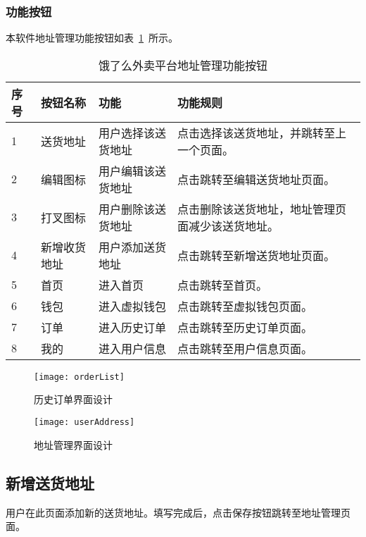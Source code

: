 \subsubsection{功能按钮}
本软件地址管理功能按钮如表~\ref{tab:table13}~所示。
\begin{table}[htbp]
    \caption{饿了么外卖平台地址管理功能按钮}\label{tab:table13}
    \vspace{0.5em}\wuhao
    \begin{tabularx}{\textwidth}{lllX}
    \toprule[1.5pt]
    序号 & 按钮名称 & 功能 & 功能规则 \\ 
    \midrule[1pt]
    1 & 送货地址 & 用户选择该送货地址 & 点击选择该送货地址，并跳转至上一个页面。 \\
    2 & 编辑图标 & 用户编辑该送货地址 & 点击跳转至编辑送货地址页面。 \\
    3 & 打叉图标 & 用户删除该送货地址 & 点击删除该送货地址，地址管理页面减少该送货地址。 \\
    4 & 新增收货地址 & 用户添加送货地址 & 点击跳转至新增送货地址页面。 \\
    5 & 首页 & 进入首页 & 点击跳转至首页。 \\
    6 & 钱包 & 进入虚拟钱包 & 点击跳转至虚拟钱包页面。 \\
    7 & 订单 & 进入历史订单 & 点击跳转至历史订单页面。 \\
    8 & 我的 & 进入用户信息 & 点击跳转至用户信息页面。 \\
\bottomrule[1.5pt]
\end{tabularx}
\vspace{\baselineskip}
\end{table}
\begin{figure}[htbp]
    \centering
    \begin{minipage}{0.4\textwidth}
    \centering
    \texttt{[image: orderList]}
    \caption{历史订单界面设计}\label{fig:orderList}
    \end{minipage}
    \begin{minipage}{0.4\textwidth}
    \centering
    \texttt{[image: userAddress]}
    \caption{地址管理界面设计}\label{fig:userAddress}
    \end{minipage}
    \vspace{\baselineskip}
\end{figure}

\subsection{新增送货地址}
用户在此页面添加新的送货地址。填写完成后，点击保存按钮跳转至地址管理页面。

